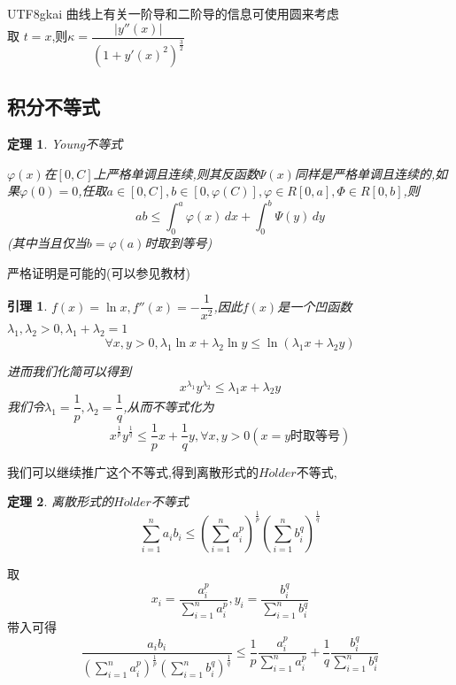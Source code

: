 \documentclass{article}
\newtheorem{theorem}{定理}[subsection]
\newtheorem{lemma}{引理}[subsection]
\newenvironment{cproof}{%
\heiti{证明}\kaishu
}{%
}
\newcommand{\parameter}[1]{\left(#1\right)}
\newcommand{\abs}[1]{\left|#1\right|}
\begin{document}
\begin{CJK}{UTF8}{gkai}
曲线上有关一阶导和二阶导的信息可使用圆来考虑\\

取 $t = x$,则$\kappa =  \dfrac{\abs{y''(x)}}{(1 + y'(x)^2)^{\frac{3}{2}}}$

\subsection{积分不等式}

\begin{theorem}
  Young不等式

  $\varphi(x)$在$[0,C]$上严格单调且连续,则其反函数$\varPsi(x)$同样是严格单调且连续的,如果$\varphi(0) = 0$,任取$a \in [0,C],b\in[0,\varphi(C)],\varphi\in R[0,a],\varPhi \in R[0,b]$,则
  \[ab \leq \int_{0}^{a} \varphi(x) \, dx + \int_{0}^{b} \varPsi(y)\, dy\]
  (其中当且仅当$b = \varphi(a)$时取到等号)
\end{theorem}
\begin{cproof}
严格证明是可能的(可以参见教材)
\end{cproof}

\begin{lemma}
  
  $f(x) = \ln x , f''(x) = -\dfrac{1}{x^2}$,因此$f(x)$是一个凹函数$\lambda_1 ,\lambda_2 > 0 ,\lambda_1 + \lambda_2 =1$ \\
  \[\forall x,y > 0, \lambda_1 \ln x + \lambda_2 \ln y \leq \ln(\lambda_1 x + \lambda_2 y)\]
  
  进而我们化简可以得到\[x^{\lambda_1} y^{\lambda_2} \leq \lambda_1 x + \lambda_2 y\]
  我们令$\lambda_1 = \dfrac{1}{p},\lambda_2 = \dfrac{1}{q}$,从而不等式化为
  \[x^{\frac{1}{p}} y^{\frac{1}{q}} \leq \dfrac{1}{p}x + \dfrac{1}{q} y,\forall x,y >0 (x = y\text{时取等号})\]
  
\end{lemma}
我们可以继续推广这个不等式,得到离散形式的$H\ddot{o}lder$不等式,

\begin{theorem}
  离散形式的$H\ddot{o}lder$不等式
  \[\sum_{i = 1}^n a_i b_i \leq \parameter{\sum_{i = 1}^n a_i^p}^{\frac{1}{p}} \parameter{\sum_{i = 1}^n b_i^q}^{\frac{1}{q}}\]
\end{theorem}

\begin{cproof}
取\[x_i = \dfrac{a_i^p}{\sum_{i = 1}^n a_i^p} , y_i = \dfrac{b_i^q}{\sum_{i =1 }^n b_i^q}\]
带入可得
\[\dfrac{a_i b_i}{\parameter{\sum_{i =1}^n  a_i^p}^{\frac{1}{p}}\parameter{\sum_{i = 1}^n b_i^q}^{\frac{1}{q}}}\leq \dfrac{1}{p}\dfrac{a_i^p}{\sum_{i = 1}^n a_i^p} + \dfrac{1}{q} \dfrac{b_i^q}{\sum_{i = 1}^n b_i^q}\]


\end{cproof}
\end{CJK}
\end{document}
